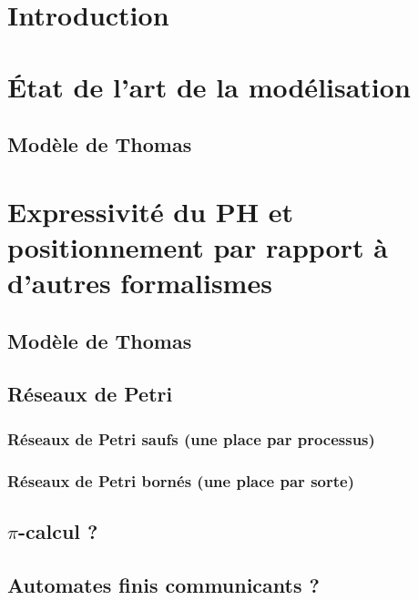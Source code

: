 \documentclass[a4paper]{report}
\begin{document}
\setcounter{tocdepth}{2}
\setcounter{secnumdepth}{3}
\tableofcontents



\chapter{Introduction}



\chapter{État de l'art de la modélisation}
  \section{Modèle de Thomas}
  





\chapter{Expressivité du PH et positionnement par rapport à d'autres formalismes}
  \section{Modèle de Thomas}
  \section{Réseaux de Petri}
    \subsection{Réseaux de Petri saufs (une place par processus)}
    \subsection{Réseaux de Petri bornés (une place par sorte)}
  \section{$\pi$-calcul ?}
  \section{Automates finis communicants ?}
\end{document}
